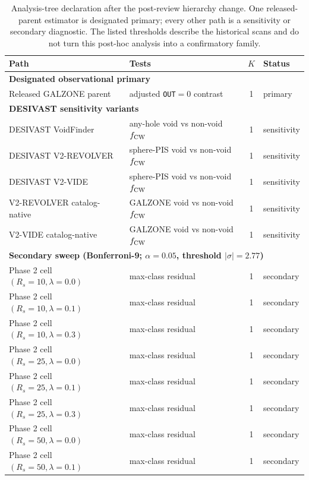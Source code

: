 \documentclass[aps,prd,twocolumn,superscriptaddress,showpacs,preprintnumbers,nofootinbib,longbibliography,floatfix]{revtex4-2}
\begin{document}
\begin{table}[ht]
\caption{Analysis-tree declaration after the post-review hierarchy
change. One released-parent estimator is designated primary; every
other path is a sensitivity or secondary diagnostic. The listed
thresholds describe the historical scans and do not turn this post-hoc
analysis into a confirmatory family.}
\label{tab:analysis_tree}
\begin{ruledtabular}
\begin{tabular}{llcl}
Path & Tests & $K$ & Status \\
\hline
\multicolumn{4}{l}{\textbf{Designated observational primary}} \\
Released GALZONE parent & adjusted \texttt{OUT}$=0$ contrast & 1 & primary \\
\multicolumn{4}{l}{\textbf{DESIVAST sensitivity variants}} \\
DESIVAST VoidFinder & any-hole void vs non-void $f_{\rm CW}$ & 1 & sensitivity \\
DESIVAST V2-REVOLVER & sphere-PIS void vs non-void $f_{\rm CW}$ & 1 & sensitivity \\
DESIVAST V2-VIDE & sphere-PIS void vs non-void $f_{\rm CW}$ & 1 & sensitivity \\
V2-REVOLVER catalog-native & GALZONE void vs non-void $f_{\rm CW}$ & 1 & sensitivity \\
V2-VIDE catalog-native & GALZONE void vs non-void $f_{\rm CW}$ & 1 & sensitivity \\
\hline
\multicolumn{4}{l}{\textbf{Secondary sweep (Bonferroni-9; $\alpha=0.05$, threshold $|\sigma|=2.77$)}} \\
Phase 2 cell $(R_s=10,\lambda=0.0)$ & max-class residual & 1 & secondary \\
Phase 2 cell $(R_s=10,\lambda=0.1)$ & max-class residual & 1 & secondary \\
Phase 2 cell $(R_s=10,\lambda=0.3)$ & max-class residual & 1 & secondary \\
Phase 2 cell $(R_s=25,\lambda=0.0)$ & max-class residual & 1 & secondary \\
Phase 2 cell $(R_s=25,\lambda=0.1)$ & max-class residual & 1 & secondary \\
Phase 2 cell $(R_s=25,\lambda=0.3)$ & max-class residual & 1 & secondary \\
Phase 2 cell $(R_s=50,\lambda=0.0)$ & max-class residual & 1 & secondary \\
Phase 2 cell $(R_s=50,\lambda=0.1)$ & max-class residual & 1 & secondary \\

\end{tabular}
\end{ruledtabular}
\end{table}
\end{document}
